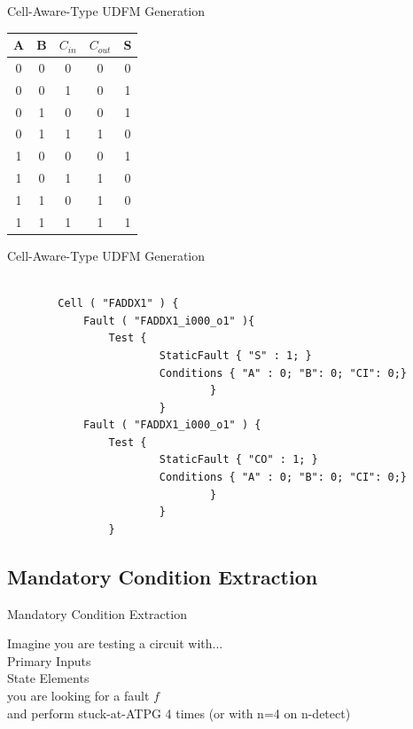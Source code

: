 \documentclass{beamer}
\begin{document}
\begin{frame}{Cell-Aware-Type UDFM Generation}
\begin{center}
\begin{table}
\begin{tabular} {c | c | c || c | c }
A & B & $C_{in}$ & $C_{out}$ & S\\
\hline
0&0&0&0&0 \\ 
0&0&1&0&1 \\
0&1&0&0&1 \\
0&1&1&1&0 \\
1&0&0&0&1 \\
1&0&1&1&0 \\
1&1&0&1&0 \\
1&1&1&1&1 \\

\end{tabular}
\end{table}
\end{center}
\end{frame}






\begin{frame}[fragile]{Cell-Aware-Type UDFM Generation}
\lstset{breaklines=true, basicstyle=\ttfamily\scriptsize}\vspace{-1em}
\begin{lstlisting}[frame=single]

        Cell ( "FADDX1" ) {
            Fault ( "FADDX1_i000_o1" ){
                Test {
                        StaticFault { "S" : 1; }
                        Conditions { "A" : 0; "B": 0; "CI": 0;}
                                }
                        }
            Fault ( "FADDX1_i000_o1" ) {
                Test {
                        StaticFault { "CO" : 1; }
                        Conditions { "A" : 0; "B": 0; "CI": 0;}
                                }
                        }
                }
\end{lstlisting}

\end{frame}

\subsection{Mandatory Condition Extraction}
\begin{frame}{Mandatory Condition Extraction}
\begin{center}
    Imagine you are testing a circuit with... \\
     Primary Inputs \\
     State Elements \\
    \pause you are looking for a fault $f$ \\
    \pause and perform stuck-at-ATPG 4 times (or with n=4 on n-detect)
    \end{center}
\end{frame}
\end{document}
